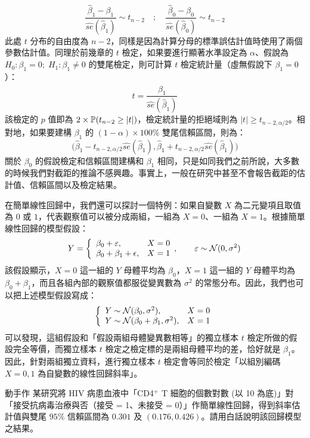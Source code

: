     \smallskip
    \[\frac{\hat{\beta}_1-\beta_1}{\widehat{se}(\hat{\beta}_1)} \sim t_{n-2} \quad ; \quad \frac{\hat{\beta}_0-\beta_0}{\widehat{se}(\hat{\beta}_0)} \sim t_{n-2}\]
    \smallskip
    此處 $t$ 分布的自由度為 $n-2$，同樣是因為計算分母的標準誤估計值時使用了兩個參數估計值。同理於前幾章的 $t$ 檢定，如果要進行顯著水準設定為 $\alpha$、假說為 $H_0: \beta_1 = 0;\; H_1: \beta_1 \ne 0$ 的雙尾檢定，則可計算 $t$ 檢定統計量（虛無假說下 $\beta_1 = 0$）：
    \smallskip
    \[t = \frac{\hat{\beta}_1}{\widehat{se}(\hat{\beta}_1)}\]
    \smallskip
    該檢定的 $p$ 值即為 $2\times\mathbb{P}(t_{n-2} \ge |t|)$，檢定統計量的拒絕域則為 $|t| \ge t_{n-2, \alpha/2}$。相對地，如果要建構 $\beta_1$ 的 $(1-\alpha)\times 100\%$ 雙尾信賴區間，則為：
    \smallskip
    \[\Big(\hat{\beta}_1 - t_{n-2, \alpha/2}\widehat{se}(\hat{\beta}_1), \hat{\beta}_1 + t_{n-2, \alpha/2}\widehat{se}(\hat{\beta}_1)\Big)\]
    \smallskip
    關於 $\beta_0$ 的假說檢定和信賴區間建構和 $\beta_1$ 相同，只是如同我們之前所說，大多數的時候我們對截距的推論不感興趣。事實上，一般在研究中甚至不會報告截距的估計值、信賴區間以及檢定結果。

    \medskip

    在簡單線性回歸中，我們還可以探討一個特例：如果自變數 $X$ 為二元變項且取值為 $0$ 或 $1$，代表觀察值可以被分成兩組，一組為 $X=0$、一組為 $X=1$。根據簡單線性回歸的模型假設：
    \smallskip
    \[Y = \left\{\begin{array}{lr}
        \beta_0 + \varepsilon, & X = 0\\
        \beta_0 + \beta_1 + \epsilon, & X = 1
    \end{array}, \qquad \varepsilon \sim \mathcal{N}(0, \sigma^2) \right.\]
    \smallskip
    該假設顯示，$X=0$ 這一組的 $Y$ 母體平均為 $\beta_0$，$X=1$ 這一組的 $Y$ 母體平均為 $\beta_0 + \beta_1$，而且各組內部的觀察值都服從變異數為 $\sigma^2$ 的常態分布。因此，我們也可以把上述模型假設寫成：
    \smallskip
    \[\left\{\begin{array}{lr}
        Y \sim \mathcal{N}(\beta_0,\sigma^2), & X = 0\\
        Y \sim \mathcal{N}(\beta_0 + \beta_1, \sigma^2), & X = 1
    \end{array} \right.\]
    \smallskip
    可以發現，這組假設和「假設兩組母體變異數相等」的獨立樣本 $t$ 檢定所做的假設完全等價，而獨立樣本 $t$ 檢定之檢定標的是兩組母體平均的差，恰好就是 $\beta_1$。因此，針對兩組獨立資料，進行獨立樣本 $t$ 檢定會等同於檢定「以組別編碼 $X=0,1$ 為自變數的線性回歸斜率」。

    \bigskip

    \begin{custom}{動手作}
       某研究將 HIV 病患血液中「CD4$^+$ T 細胞的個數對數 (以 10 為底)」對「接受抗病毒治療與否（接受 = 1、未接受 = 0）」作簡單線性回歸，得到斜率估計值與雙尾 $95\%$ 信賴區間為 $0.301$ 及 $(0.176,0.426)$。請用白話說明該回歸模型之結果。
    \end{custom}

